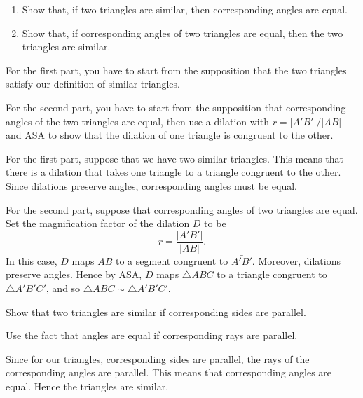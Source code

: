 \documentclass[newpage,hints,handout,12pt,noauthor,nooutcomes]{ximera}
\begin{document}
\begin{problem}\hfil
\begin{enumerate}
\item Show that, if two triangles are similar, then corresponding
angles are equal.

\item Show that, if corresponding angles of two triangles are equal, then the two
triangles are similar.
\end{enumerate}

\begin{hint}
For the first part, you have to start from the supposition that the
two triangles satisfy our definition of similar triangles.
\end{hint}
\begin{hint}
For the second part, you have to start from the supposition that
corresponding angles of the two triangles are equal, then use a
dilation with $r=|A'B'|/|AB|$ and ASA to show that the dilation of one
triangle is congruent to the other.
\end{hint}
\begin{freeResponse}
For the first part, suppose that we have two similar triangles. This
means that there is a dilation that takes one triangle to a triangle
congruent to the other. Since dilations preserve angles,
corresponding angles must be equal.

For the second part, suppose that corresponding angles of two
triangles are equal. Set the magnification factor of the dilation $D$
to be
\[
r = \frac{|A'B'|}{|AB|}.
\]
In this case, $D$ maps $\bar{AB}$ to a segment congruent to
$\bar{A'B'}$. Moreover, dilations preserve angles. Hence by ASA, $D$
maps $\triangle ABC$ to a triangle congruent to $\triangle A'B'C'$,
and so $\triangle ABC \sim \triangle A'B'C'$.
\end{freeResponse}
\end{problem}

\begin{problem}
\label{39} Show that two triangles are similar if corresponding
sides are parallel.
\begin{hint}
Use the fact that angles are equal if corresponding rays are parallel.
\end{hint}
\begin{freeResponse}
Since for our triangles, corresponding sides are parallel, the rays of
the corresponding angles are parallel. This means that corresponding
angles are equal. Hence the triangles are similar.
\end{freeResponse}
\end{problem}
\end{document}
